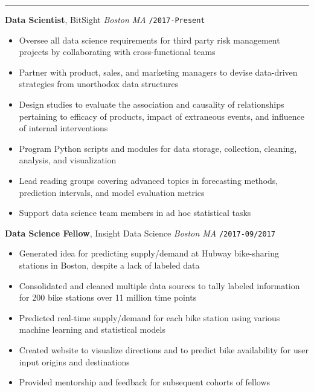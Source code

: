 \documentclass[10pt,english]{report}
\begin{document}
{}
\vspace{1mm}\hrule
\vspace{1mm}

\textbf{Data Scientist}, BitSight \hfill \textit{Boston MA} \texttt{/2017-Present}
\vspace{1mm}
\begin{itemize}
\item Oversee all data science requirements for third party risk management projects by collaborating with cross-functional teams
\item Partner with product, sales, and marketing managers to devise data-driven strategies from unorthodox data structures
\item Design studies to evaluate the association and causality of relationships pertaining to efficacy of products, impact of extraneous events, and influence of internal interventions
\item Program Python scripts and modules for data storage, collection, cleaning, analysis, and visualization
\item Lead reading groups covering advanced topics in forecasting methods, prediction intervals, and model evaluation metrics
\item Support data science team members in ad hoc statistical tasks
\end{itemize}

\vspace{1mm}

\textbf{Data Science Fellow}, Insight Data Science \hfill \textit{Boston MA} \texttt{/2017-09/2017}
\begin{itemize}
\item Generated idea for predicting supply/demand at Hubway bike-sharing stations in Boston, despite a lack of labeled data
\item Consolidated and cleaned multiple data sources to tally labeled information for 200 bike stations over 11 million time points
\item Predicted real-time supply/demand for each bike station using various machine learning and statistical models
\item Created website to visualize directions and to predict bike availability for user input origins and destinations
\item Provided mentorship and feedback for subsequent cohorts of fellows
\end{itemize}
\end{document}
